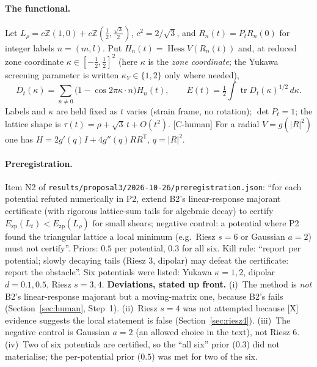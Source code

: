 \documentclass[10pt]{article}
\newcommand{\tier}[1]{\textsf{[#1]}}
\newcommand{\tX}{\tier{X}}
\newcommand{\tCh}{\tier{C-human}}
\newcommand{\Ezp}{E_{\mathrm{zp}}}
\newcommand{\tr}{\operatorname{tr}}
\newcommand{\hess}{\operatorname{Hess}}
\begin{document}
\paragraph{The functional.} Let $L_\rho=c\mathbb Z(1,0)+c\mathbb Z(\tfrac12,\tfrac{\sqrt3}2)$, $c^2=2/\sqrt3$, and $R_n(t)=P_tR_n(0)$ for integer labels $n=(m,l)$. Put $H_n(t)=\hess V(R_n(t))$ and, at reduced zone coordinate $\kappa\in[-\tfrac12,\tfrac12]^2$ (here $\kappa$ is the \emph{zone coordinate}; the Yukawa screening parameter is written $\kappa_Y\in\{1,2\}$ only where needed),
\[D_t(\kappa)=\sum_{n\ne0}\bigl(1-\cos2\pi\kappa\!\cdot\! n\bigr)H_n(t),\qquad E(t)=\tfrac12\int\tr D_t(\kappa)^{1/2}\,d\kappa .\]
Labels and $\kappa$ are held fixed as $t$ varies (strain frame, no rotation); $\det P_t=1$; the lattice shape is $\tau(t)=\rho+\sqrt3\,t+O(t^2)$. \tCh{} For a radial $V=g(|R|^2)$ one has $H=2g'(q)I+4g''(q)RR^{\mathsf T}$, $q=|R|^2$.

\paragraph{Preregistration.} Item N2 of \texttt{results/proposal3/2026-10-26/preregistration.json}: ``for each potential refuted numerically in P2, extend B2's linear-response majorant certificate (with rigorous lattice-sum tails for algebraic decay) to certify $\Ezp(L_t)<\Ezp(L_\rho)$ for small shears; negative control: a potential where P2 found the triangular lattice a local minimum (e.g.\ Riesz $s=6$ or Gaussian $a=2$) must not certify''. Priors: $0.5$ per potential, $0.3$ for all six. Kill rule: ``report per potential; slowly decaying tails (Riesz 3, dipolar) may defeat the certificate: report the obstacle''. Six potentials were listed: Yukawa $\kappa=1,2$, dipolar $d=0.1,0.5$, Riesz $s=3,4$.
\textbf{Deviations, stated up front.} (i)~The method is \emph{not} B2's linear-response majorant but a moving-matrix one, because B2's fails (Section~\ref{sec:human}, Step~1). (ii)~Riesz $s=4$ was not attempted because \tX{} evidence suggests the local statement is false (Section~\ref{sec:riesz4}). (iii)~The negative control is Gaussian $a=2$ (an allowed choice in the text), not Riesz $6$. (iv)~Two of six potentials are certified, so the ``all six'' prior ($0.3$) did not materialise; the per-potential prior ($0.5$) was met for two of the six.

\end{document}
